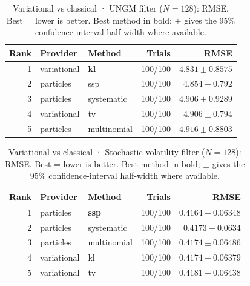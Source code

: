 \begin{table}[!htbp]
\centering
\small
\caption{Variational vs classical · UNGM filter ($N=128$): RMSE. Best = lower is better. Best method in bold; $\pm$ gives the 95\% confidence-interval half-width where available.}
\label{tab:variational-vs-classical-ungm-filter-rmse}
\begin{tabular}{rllrr}
\toprule
Rank & Provider & Method & Trials & RMSE \\
\midrule
1 & variational & \textbf{kl} & 100/100 & $\mathbf{4.831 \pm 0.8575}$ \\
2 & particles & ssp & 100/100 & $4.854 \pm 0.792$ \\
3 & particles & systematic & 100/100 & $4.906 \pm 0.9289$ \\
4 & variational & tv & 100/100 & $4.906 \pm 0.794$ \\
5 & particles & multinomial & 100/100 & $4.916 \pm 0.8803$ \\
\bottomrule
\end{tabular}
\end{table}


\begin{table}[!htbp]
\centering
\small
\caption{Variational vs classical · Stochastic volatility filter ($N=128$): RMSE. Best = lower is better. Best method in bold; $\pm$ gives the 95\% confidence-interval half-width where available.}
\label{tab:variational-vs-classical-stochastic-volatility-filter-rmse}
\begin{tabular}{rllrr}
\toprule
Rank & Provider & Method & Trials & RMSE \\
\midrule
1 & particles & \textbf{ssp} & 100/100 & $\mathbf{0.4164 \pm 0.06348}$ \\
2 & particles & systematic & 100/100 & $0.4173 \pm 0.0634$ \\
3 & particles & multinomial & 100/100 & $0.4174 \pm 0.06486$ \\
4 & variational & kl & 100/100 & $0.4174 \pm 0.06379$ \\
5 & variational & tv & 100/100 & $0.4181 \pm 0.06438$ \\
\bottomrule
\end{tabular}
\end{table}


